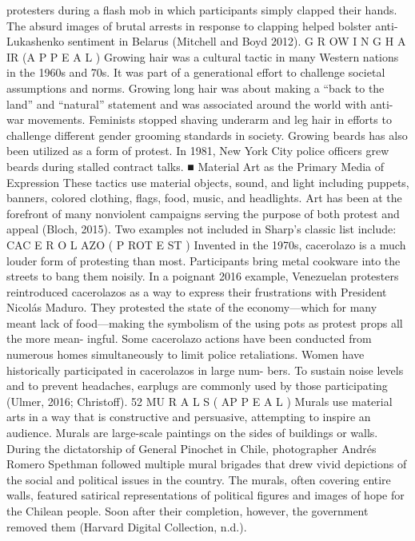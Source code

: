 \documentclass[twoside,a4paper,12pt,fleqn,openany]{extbook}
\begin{document}
protesters during a flash mob in which participants simply clapped their hands. The absurd
images of brutal arrests in response to clapping helped bolster anti-Lukashenko sentiment
in Belarus (Mitchell and Boyd 2012).
G R OW I N G H A IR (A P P E A L )
Growing hair was a cultural tactic in many Western nations in the 1960s and 70s. It was part
of a generational effort to challenge societal assumptions and norms. Growing long hair was
about making a “back to the land” and “natural” statement and was associated around the
world with anti-war movements. Feminists stopped shaving underarm and leg hair in efforts
to challenge different gender grooming standards in society. Growing beards has also been
utilized as a form of protest. In 1981, New York City police officers grew beards during stalled
contract talks.
■ Material Art as the Primary Media of Expression
These tactics use material objects, sound, and light including puppets, banners, colored
clothing, flags, food, music, and headlights. Art has been at the forefront of many nonviolent
campaigns serving the purpose of both protest and appeal (Bloch, 2015). Two examples not
included in Sharp’s classic list include:
CAC E R O L AZO ( P ROT E ST )
Invented in the 1970s, cacerolazo is a much louder form of protesting than most. Participants
bring metal cookware into the streets to bang them noisily. In a poignant 2016 example,
Venezuelan protesters reintroduced cacerolazos as a way to express their frustrations with
President Nicolás Maduro. They protested the state of the economy—which for many meant
lack of food—making the symbolism of the using pots as protest props all the more mean-
ingful. Some cacerolazo actions have been conducted from numerous homes simultaneously
to limit police retaliations. Women have historically participated in cacerolazos in large num-
bers. To sustain noise levels and to prevent headaches, earplugs are commonly used by
those participating (Ulmer, 2016; Christoff).
52
MU R A L S ( AP P E A L )
Murals use material arts in a way that is constructive and persuasive, attempting to inspire
an audience. Murals are large-scale paintings on the sides of buildings or walls. During the
dictatorship of General Pinochet in Chile, photographer Andrés Romero Spethman followed
multiple mural brigades that drew vivid depictions of the social and political issues in the
country. The murals, often covering entire walls, featured satirical representations of political
figures and images of hope for the Chilean people. Soon after their completion, however,
the government removed them (Harvard Digital Collection, n.d.).
\end{document}
